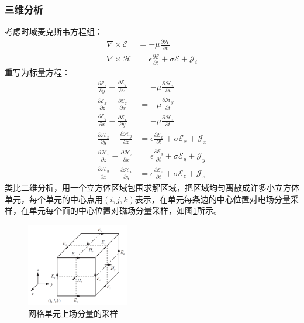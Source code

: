 \documentclass{article}
\numberwithin{equation}{section}
\renewcommand{\vec}[1]{\boldsymbol{#1}}
\begin{document}
\subsubsection{三维分析}
考虑时域麦克斯韦方程组：
\begin{align}
    \label{eq:eq583}
    \nabla \times \vec{\mathcal{E}}&=-\mu\frac{\partial \vec{\mathcal{H}}}{\partial t} \\
    \label{eq:eq570}
    \nabla \times \vec{\mathcal{H}}&=\epsilon\frac{\partial \vec{\mathcal{E}}}{\partial t}+\sigma\vec{\mathcal{E}} +\vec{\mathcal{J}}_{i}
\end{align}
重写为标量方程：
\begin{align}
    \label{eq:eq571}
    \frac{\partial \mathcal{E}_z}{\partial y}-\frac{\partial \mathcal{E}_y}{\partial z}&=-\mu\frac{\partial \mathcal{H}_x}{\partial t} \\
    \label{eq:eq572}
    \frac{\partial \mathcal{E}_x}{\partial z}-\frac{\partial \mathcal{E}_z}{\partial x}&=-\mu\frac{\partial \mathcal{H}_y}{\partial t} \\
    \label{eq:eq573}
    \frac{\partial \mathcal{E}_y}{\partial x}-\frac{\partial \mathcal{E}_x}{\partial y}&=-\mu\frac{\partial \mathcal{H}_z}{\partial t} \\
    \label{eq:eq574}
    \frac{\partial \mathcal{H}_z}{\partial y}-\frac{\partial \mathcal{H}_y}{\partial z}&=\epsilon\frac{\partial \mathcal{E}_x}{\partial t}+\sigma\mathcal{E}_x+\mathcal{J}_x \\
    \label{eq:eq575}
    \frac{\partial \mathcal{H}_x}{\partial z}-\frac{\partial \mathcal{H}_z}{\partial x}&=\epsilon\frac{\partial \mathcal{E}_y}{\partial t}+\sigma\mathcal{E}_y+\mathcal{J}_y \\
    \label{eq:eq576}
    \frac{\partial \mathcal{H}_y}{\partial x}-\frac{\partial \mathcal{H}_x}{\partial y}&=\epsilon\frac{\partial \mathcal{E}_z}{\partial t}+\sigma\mathcal{E}_z+\mathcal{J}_z
\end{align}
类比二维分析，用一个立方体区域包围求解区域，把区域均匀离散成许多小立方体单元，每个单元的中心点用$(i,j,k)$表示，在单元每条边的中心位置对电场分量采样，在单元每个面的中心位置对磁场分量采样，如图\ref{fig:fig50}所示。
\begin{figure}[ht]
    \centering
    \includegraphics[width=0.4\textwidth]{网格单元上场分量的采样.PNG}
    \caption{网格单元上场分量的采样}
    \label{fig:fig50}
\end{figure}
\end{document}
